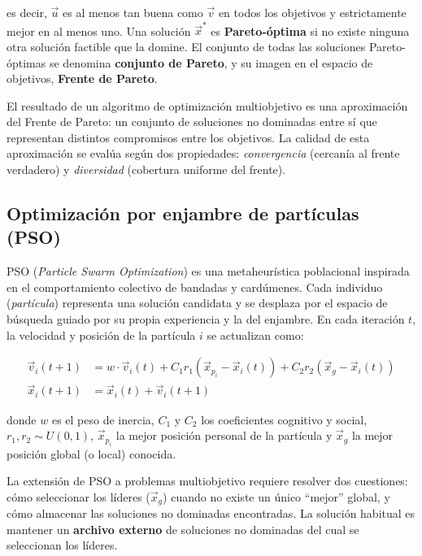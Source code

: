 es decir, $\vec{u}$ es al menos tan buena como $\vec{v}$ en todos los objetivos y estrictamente mejor en al menos uno. Una solución $\vec{x}^*$ es \textbf{Pareto-óptima} si no existe ninguna otra solución factible que la domine. El conjunto de todas las soluciones Pareto-óptimas se denomina \textbf{conjunto de Pareto}, y su imagen en el espacio de objetivos, \textbf{Frente de Pareto}.

El resultado de un algoritmo de optimización multiobjetivo es una aproximación del Frente de Pareto: un conjunto de soluciones no dominadas entre sí que representan distintos compromisos entre los objetivos. La calidad de esta aproximación se evalúa según dos propiedades: \textit{convergencia} (cercanía al frente verdadero) y \textit{diversidad} (cobertura uniforme del frente).

\subsection{Optimización por enjambre de partículas (PSO)}

PSO (\textit{Particle Swarm Optimization}) \citep{Kennedy1995} es una metaheurística poblacional inspirada en el comportamiento colectivo de bandadas y cardúmenes. Cada individuo (\textit{partícula}) representa una solución candidata y se desplaza por el espacio de búsqueda guiado por su propia experiencia y la del enjambre. En cada iteración $t$, la velocidad y posición de la partícula $i$ se actualizan como:

\begin{align}
\vec{v}_i(t+1) &= w \cdot \vec{v}_i(t) + C_1 r_1 \left( \vec{x}_{p_i} - \vec{x}_i(t) \right) + C_2 r_2 \left( \vec{x}_{g} - \vec{x}_i(t) \right) \label{eq:pso_velocidad}\\
\vec{x}_i(t+1) &= \vec{x}_i(t) + \vec{v}_i(t+1) \label{eq:pso_posicion}
\end{align}

donde $w$ es el peso de inercia, $C_1$ y $C_2$ los coeficientes cognitivo y social, $r_1, r_2 \sim U(0,1)$, $\vec{x}_{p_i}$ la mejor posición personal de la partícula y $\vec{x}_g$ la mejor posición global (o local) conocida.

La extensión de PSO a problemas multiobjetivo requiere resolver dos cuestiones: cómo seleccionar los líderes ($\vec{x}_g$) cuando no existe un único ``mejor'' global, y cómo almacenar las soluciones no dominadas encontradas. La solución habitual es mantener un \textbf{archivo externo} de soluciones no dominadas del cual se seleccionan los líderes.

